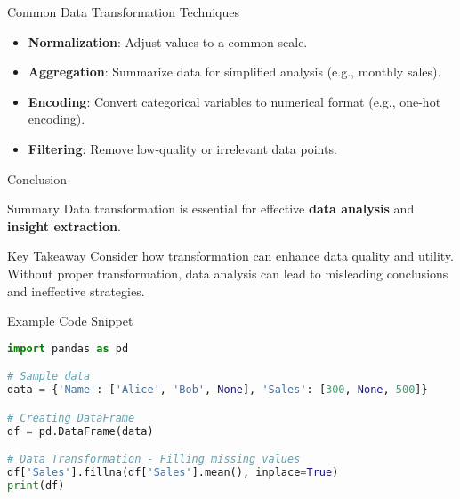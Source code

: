 \documentclass[aspectratio=169]{beamer}
\begin{document}
\begin{frame}[fragile]{Common Data Transformation Techniques}
    \begin{itemize}
        \item \textbf{Normalization}: Adjust values to a common scale.
        \item \textbf{Aggregation}: Summarize data for simplified analysis (e.g., monthly sales).
        \item \textbf{Encoding}: Convert categorical variables to numerical format (e.g., one-hot encoding).
        \item \textbf{Filtering}: Remove low-quality or irrelevant data points.
    \end{itemize}
\end{frame}

\begin{frame}[fragile]{Conclusion}
    \begin{block}{Summary}
        Data transformation is essential for effective \textbf{data analysis} and \textbf{insight extraction}.
    \end{block}
    \begin{block}{Key Takeaway}
        Consider how transformation can enhance data quality and utility. 
        Without proper transformation, data analysis can lead to misleading conclusions and ineffective strategies.
    \end{block}
\end{frame}

\begin{frame}[fragile]{Example Code Snippet}
    \begin{lstlisting}[language=Python]
import pandas as pd

# Sample data
data = {'Name': ['Alice', 'Bob', None], 'Sales': [300, None, 500]}

# Creating DataFrame
df = pd.DataFrame(data)

# Data Transformation - Filling missing values
df['Sales'].fillna(df['Sales'].mean(), inplace=True)
print(df)
    \end{lstlisting}
\end{frame}
\end{document}
